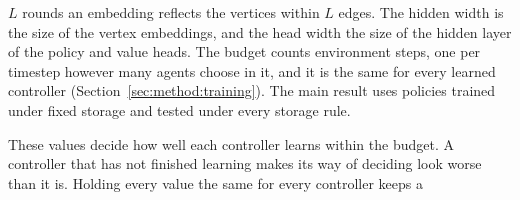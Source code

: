 $L$ rounds an embedding reflects the vertices within $L$ edges. The hidden
width is the size of the vertex embeddings, and the head width the size of
the hidden layer of the policy and value heads. The budget counts environment
steps, one per timestep however many agents choose in it, and it is the same
for every learned controller (Section~\ref{sec:method:training}). The main
result uses policies trained under fixed storage and tested under every
storage rule.

These values decide how well each controller learns within the budget. A
controller that has not finished learning makes its way of deciding look
worse than it is. Holding every value the same for every controller keeps a
